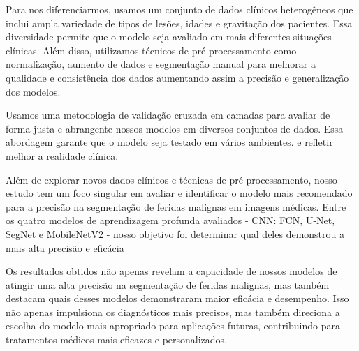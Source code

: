     Para nos diferenciarmos, usamos um conjunto de dados clínicos heterogêneos que inclui ampla variedade de tipos de lesões, idades e gravitação dos pacientes. Essa diversidade permite que o modelo seja avaliado em mais diferentes situações clínicas. Além disso, utilizamos técnicos de pré-processamento como normalização, aumento de dados e segmentação manual para melhorar a qualidade e consistência dos dados aumentando assim a precisão e generalização dos modelos.

    Usamos uma metodologia de validação cruzada em camadas para avaliar de forma justa e abrangente nossos modelos em diversos conjuntos de dados. Essa abordagem garante que o modelo seja testado em vários ambientes. e refletir melhor a realidade clínica.

    Além de explorar novos dados clínicos e técnicas de pré-processamento, nosso estudo tem um foco singular em avaliar e identificar o modelo mais recomendado para a precisão na segmentação de feridas malignas em imagens médicas. Entre os quatro modelos de aprendizagem profunda avaliados - \ac{CNN}: \ac{FCN}, \ac{U-Net}, \ac{SegNet} e \ac{MobileNetV2} - nosso objetivo foi determinar qual deles demonstrou a mais alta precisão e eficácia

    Os resultados obtidos não apenas revelam a capacidade de nossos modelos de atingir uma alta precisão na segmentação de feridas malignas, mas também destacam quais desses modelos demonstraram maior eficácia e desempenho. Isso não apenas impulsiona os diagnósticos mais precisos, mas também direciona a escolha do modelo mais apropriado para aplicações futuras, contribuindo para tratamentos médicos mais eficazes e personalizados.
